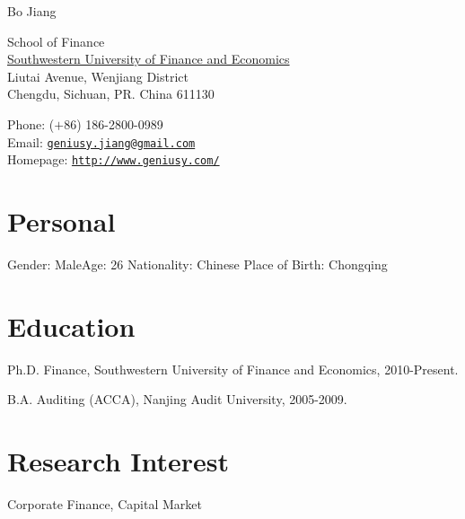\documentclass[letterpaper]{article}
\def\name{Bo Jiang}
\renewenvironment{itemize}{
  \begin{list}{}{
    \setlength{\leftmargin}{1.5em}
    \setlength{\itemsep}{0pt}
  }
}{
  \end{list}
}
\begin{document}
{\huge \name}


\vspace{0.25in}
\begin{minipage}{0.55\linewidth}
  School of Finance \\
  \href{http://www.swufe.edu.cn/}{Southwestern University of Finance and Economics} \\
  Liutai Avenue, Wenjiang District\\
  Chengdu, Sichuan, PR. China 611130
\end{minipage}
\vspace{0.25in}
\begin{minipage}{0.40\linewidth}
  Phone: ($+$86) 186-2800-0989 \\
  Email: \href{mailto:geniusy.jiang@gmail.com}{\tt geniusy.jiang@gmail.com} \\
  Homepage: \href{http://www.geniusy.com/}{\tt http://www.geniusy.com/} \\
\end{minipage}

\vspace{-1.5em}
\section*{Personal}
\begin{itemize}
\item Gender: Male\qquad Age: 26 \qquad Nationality: Chinese \qquad Place of Birth: Chongqing
\end{itemize}

\section*{Education}
\begin{itemize}
  \item Ph.D. Finance, Southwestern University of Finance and Economics, 2010-Present.
  \item B.A. Auditing (ACCA), Nanjing Audit University, 2005-2009.
\end{itemize}

\section*{Research Interest}
\begin{itemize}
\item Corporate Finance, Capital Market
\end{itemize}
\end{document}
